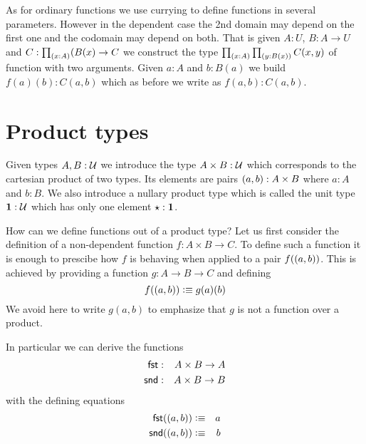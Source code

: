 As for ordinary functions we use currying to define functions in
several parameters. However in the dependent case the 2nd domain may
depend on the first one and the codomain may depend on both. That is
given $A:U$, $B : A \to U$ and $C : \prd{x:A}(B(x) \to C$ we construct
the type $\prd{x:A}{y : B(x)} C(x,y)$ of function with two
arguments. Given $a:A$ and $b:B(a)$ we build $f(a)(b) : C(a,b)$ which
as before we write as $f(a,b) : C(a,b)$.





\section{Product types}
\label{sec:finite-product-types}

Given types $A,B:\mathcal{U}$ we introduce the type $A\times B:\mathcal{U}$ which
corresponds to the cartesian product of two types. Its elements are
pairs $( a,b) : A \times B$ where $a:A$ and $b:B$. We also
introduce a nullary product type which is called the unit type $\mathbf{1}
: \mathcal{U}$ which has only one element $\star : \mathbf{1}$.

How can we define functions out of a product type? Let us first
consider the definition of a non-dependent function $f : A\times B \to
C$. To define such a function it is enough to prescibe how $f$ is
behaving when applied to a pair $f(( a,b))$. This is achieved by
providing a function $g : A \to B \to C$ and defining
\[ f(( a,b)) \vcentcolon\equiv g(a)(b) \]
We avoid here to write $g(a,b)$ to emphasize that $g$ is not a
function over a product. 

In particular we can derive the functions
\begin{eqnarray*}
  \mathsf{fst} & : & A \times B \to A \\
  \mathsf{snd} & : & A \times B \to B
\end{eqnarray*}
with the defining equations 
\begin{eqnarray*}
  \mathsf{fst}(( a,b)) & \vcentcolon\equiv & a \\
  \mathsf{snd}(( a,b)) & \vcentcolon\equiv & b
\end{eqnarray*}

